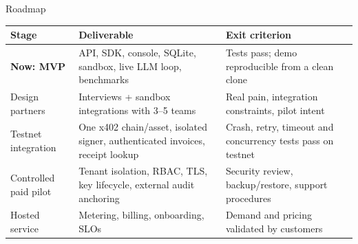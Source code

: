 \documentclass{beamer}
\newcommand{\good}[1]{\textcolor{okgreen}{\textbf{#1}}}
\begin{document}
\begin{frame}{Roadmap}
\footnotesize
\begin{center}
\begin{tabular}{@{}p{3.1cm}p{5.2cm}p{4.9cm}@{}}
  \toprule
  \textbf{Stage} & \textbf{Deliverable} & \textbf{Exit criterion} \\
  \midrule
  \good{Now: MVP} & API, SDK, console, SQLite, sandbox, live LLM loop,
    benchmarks & Tests pass; demo reproducible from a clean clone \\[2pt]
  Design partners & Interviews + sandbox integrations with 3--5 teams
    & Real pain, integration constraints, pilot intent \\[2pt]
  Testnet integration & One x402 chain/asset, isolated signer,
    authenticated invoices, receipt lookup
    & Crash, retry, timeout and concurrency tests pass on testnet \\[2pt]
  Controlled paid pilot & Tenant isolation, RBAC, TLS, key lifecycle,
    external audit anchoring & Security review, backup/restore,
    support procedures \\[2pt]
  Hosted service & Metering, billing, onboarding, SLOs
    & Demand and pricing validated by customers \\
  \bottomrule
\end{tabular}
\end{center}
\end{frame}
\end{document}
